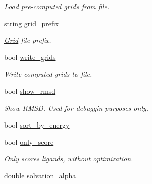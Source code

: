 \begin{DoxyCompactItemize}
\begin{DoxyCompactList}\small\item\em Load pre-\/computed grids from file. \item\end{DoxyCompactList}\item 
\hypertarget{classPARSER_a023b62e5f1631899ba2916344a3185ea}{
string \hyperlink{classPARSER_a023b62e5f1631899ba2916344a3185ea}{grid\_\-prefix}}
\label{classPARSER_a023b62e5f1631899ba2916344a3185ea}

\begin{DoxyCompactList}\small\item\em \hyperlink{classGrid}{Grid} file prefix. \item\end{DoxyCompactList}\item 
\hypertarget{classPARSER_a95e2d120bdb28932a0fd7cfcf362f35d}{
bool \hyperlink{classPARSER_a95e2d120bdb28932a0fd7cfcf362f35d}{write\_\-grids}}
\label{classPARSER_a95e2d120bdb28932a0fd7cfcf362f35d}

\begin{DoxyCompactList}\small\item\em Write computed grids to file. \item\end{DoxyCompactList}\item 
\hypertarget{classPARSER_a49c71c88e94cb132fc880db52f4f1f0a}{
bool \hyperlink{classPARSER_a49c71c88e94cb132fc880db52f4f1f0a}{show\_\-rmsd}}
\label{classPARSER_a49c71c88e94cb132fc880db52f4f1f0a}

\begin{DoxyCompactList}\small\item\em Show RMSD. Used for debuggin purposes only. \item\end{DoxyCompactList}\item 
bool \hyperlink{classPARSER_a2b4a169dd1600254c33ebb5338342795}{sort\_\-by\_\-energy}
\item 
\hypertarget{classPARSER_aeb4a5fc53598e83929871ea481bd5a5a}{
bool \hyperlink{classPARSER_aeb4a5fc53598e83929871ea481bd5a5a}{only\_\-score}}
\label{classPARSER_aeb4a5fc53598e83929871ea481bd5a5a}

\begin{DoxyCompactList}\small\item\em Only scores ligands, without optimization. \item\end{DoxyCompactList}\item 
\hypertarget{classPARSER_aed226057b66b2aaafee2ff0215f2ade8}{
double \hyperlink{classPARSER_aed226057b66b2aaafee2ff0215f2ade8}{solvation\_\-alpha}}
\label{classPARSER_aed226057b66b2aaafee2ff0215f2ade8}


\end{DoxyCompactItemize}
